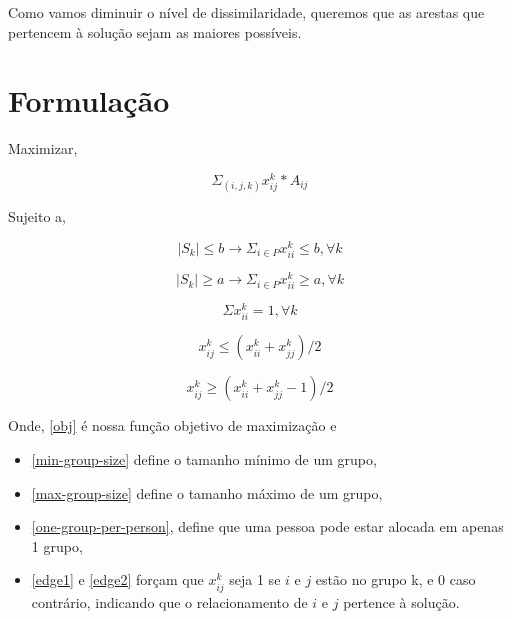 \documentclass[conference]{IEEEtran}
\begin{document}
   Como vamos diminuir o nível de dissimilaridade, queremos que as arestas que pertencem à solução sejam as maiores possíveis.

\newpage
\section {Formulação}

   Maximizar,

   \begin{equation}
       \Sigma_{(i,j,k)} x_{ij}^{k} * A_{ij}
   \label{obj}
   \end{equation}

   Sujeito a,

   \begin{equation}
       |S_k| \leq b \rightarrow \Sigma_{i \in P} x_{ii}^{k} \leq b, \forall k
   \label{min-group-size}
   \end{equation}

   \begin{equation}
       |S_k| \geq a \rightarrow \Sigma_{i \in P} x_{ii}^{k} \geq a, \forall k
   \label{max-group-size}
   \end{equation}

   \begin{equation}
       \Sigma x_{ii}^{k} = 1, \forall k
   \label{one-group-per-person}
   \end{equation}

   \begin{equation}
       x_{ij}^{k} \leq (x_{ii}^{k} + x_{jj}^{k})/2
   \label{edge1}
   \end{equation}

   \begin{equation}
       x_{ij}^{k} \geq (x_{ii}^{k} + x_{jj}^{k} -1)/2
   \label{edge2}
   \end{equation}


   Onde, \ref{obj} é nossa função objetivo de maximização e

   \begin{itemize}
       \item \ref{min-group-size} define o tamanho mínimo de um grupo,
       \item \ref{max-group-size} define o tamanho máximo de um grupo,
       \item \ref{one-group-per-person}, define que uma pessoa pode estar alocada em apenas 1 grupo,
       \item \ref{edge1} e \ref{edge2} forçam que $x_{ij}^{k}$ seja 1 se $i$ e $j$ estão no grupo k, e $0$ caso contrário, indicando que o relacionamento de $i$ e $j$ pertence à solução.
   \end{itemize}
\end{document}
